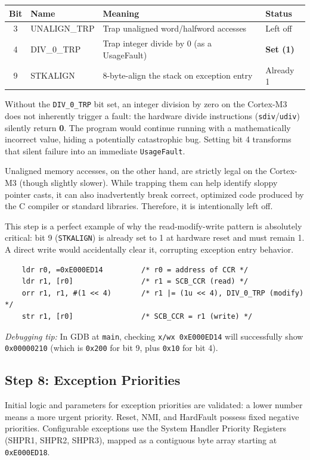 \begin{table}[h!]
    \centering
    \begin{tabular}{|c|l|l|l|}
        \hline
        \textbf{Bit} & \textbf{Name} & \textbf{Meaning} & \textbf{Status} \\ \hline
        3 & UNALIGN\_TRP & Trap unaligned word/halfword accesses & Left off \\ \hline
        4 & DIV\_0\_TRP & Trap integer divide by 0 (as a UsageFault) & \textbf{Set (1)} \\ \hline
        9 & STKALIGN & 8-byte-align the stack on exception entry & Already 1 \\ \hline
    \end{tabular}
\end{table}

Without the \texttt{DIV\_0\_TRP} bit set, an integer division by zero on the Cortex-M3 does not inherently trigger a fault: the hardware divide instructions (\texttt{sdiv}/\texttt{udiv}) silently return \textbf{0}. The program would continue running with a mathematically incorrect value, hiding a potentially catastrophic bug. Setting bit 4 transforms that silent failure into an immediate \texttt{UsageFault}. 

Unaligned memory accesses, on the other hand, are strictly legal on the Cortex-M3 (though slightly slower). While trapping them can help identify sloppy pointer casts, it can also inadvertently break correct, optimized code produced by the C compiler or standard libraries. Therefore, it is intentionally left off.

This step is a perfect example of why the read-modify-write pattern is absolutely critical: bit 9 (\texttt{STKALIGN}) is already set to 1 at hardware reset and must remain 1. A direct write would accidentally clear it, corrupting exception entry behavior.

\begin{lstlisting}
    ldr r0, =0xE000ED14         /* r0 = address of CCR */
    ldr r1, [r0]                /* r1 = SCB_CCR (read) */
    orr r1, r1, #(1 << 4)       /* r1 |= (1u << 4), DIV_0_TRP (modify) */
    str r1, [r0]                /* SCB_CCR = r1 (write) */
\end{lstlisting}

\textit{Debugging tip:} In GDB at \texttt{main}, checking \texttt{x/wx 0xE000ED14} will successfully show \texttt{0x00000210} (which is \texttt{0x200} for bit 9, plus \texttt{0x10} for bit 4).

\subsection{Step 8: Exception Priorities}
Initial logic and parameters for exception priorities are validated: a lower number means a more urgent priority. Reset, NMI, and HardFault possess fixed negative priorities. Configurable exceptions use the System Handler Priority Registers (SHPR1, SHPR2, SHPR3), mapped as a contiguous byte array starting at \texttt{0xE000ED18}.

